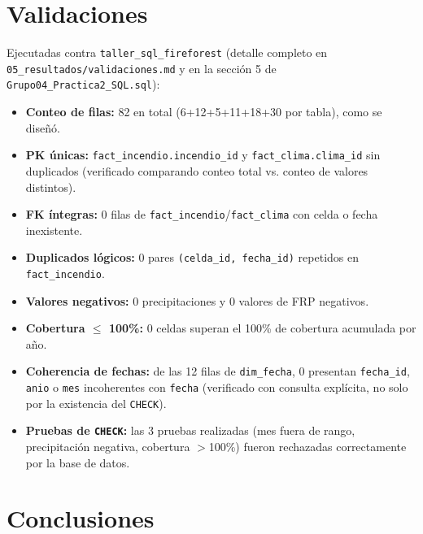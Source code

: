 \documentclass[11pt,a4paper]{article}
\begin{document}
\section{Validaciones}

Ejecutadas contra \texttt{taller\_sql\_fireforest} (detalle completo en
\texttt{05\_resultados/\allowbreak validaciones.md} y en la secci\'on 5 de
\texttt{Grupo04\_Practica2\_SQL.sql}):

\begin{itemize}
    \item \textbf{Conteo de filas:} 82 en total (6+12+5+11+18+30 por tabla), como se dise\~n\'o.
    \item \textbf{PK \'unicas:} \texttt{fact\_incendio.incendio\_id} y \texttt{fact\_clima.clima\_id}
          sin duplicados (verificado comparando conteo total vs. conteo de valores distintos).
    \item \textbf{FK \'integras:} 0 filas de \texttt{fact\_incendio}/\texttt{fact\_clima} con
          celda o fecha inexistente.
    \item \textbf{Duplicados l\'ogicos:} 0 pares \texttt{(celda\_id, fecha\_id)} repetidos en
          \texttt{fact\_incendio}.
    \item \textbf{Valores negativos:} 0 precipitaciones y 0 valores de FRP negativos.
    \item \textbf{Cobertura $\leq$ 100\%:} 0 celdas superan el 100\% de cobertura acumulada por
          a\~no.
    \item \textbf{Coherencia de fechas:} de las 12 filas de \texttt{dim\_fecha}, 0 presentan
          \texttt{fecha\_id}, \texttt{anio} o \texttt{mes} incoherentes con \texttt{fecha}
          (verificado con consulta expl\'icita, no solo por la existencia del \texttt{CHECK}).
    \item \textbf{Pruebas de \texttt{CHECK}:} las 3 pruebas realizadas (mes fuera de rango,
          precipitaci\'on negativa, cobertura $>$100\%) fueron rechazadas correctamente por la
          base de datos.
\end{itemize}

\section{Conclusiones}
\end{document}
